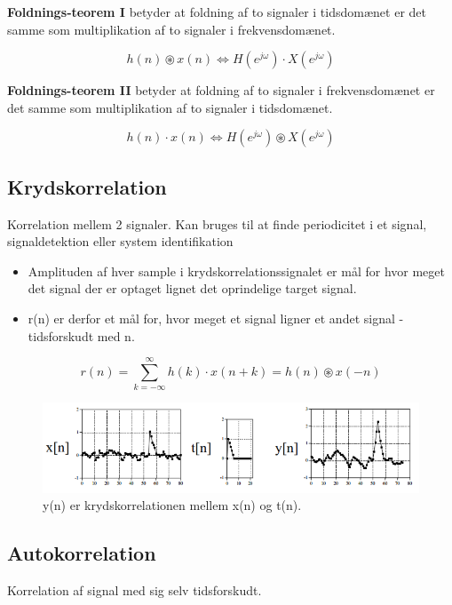 \documentclass[danish]{article}
\begin{document}
\textbf{Foldnings‐teorem I} betyder at foldning af to signaler i tidsdomænet er det samme som multiplikation af to signaler i frekvensdomænet.

\begin{equation}
h(n) \circledast x(n) \Leftrightarrow H(e^{j\omega}) \cdot X(e^{j\omega})
\end{equation}

\textbf{Foldnings-teorem II} betyder at foldning af to signaler i frekvensdomænet er det samme som multiplikation af to signaler i tidsdomænet. 

\begin{equation}
h(n) \cdot x(n) \Leftrightarrow H(e^{j\omega}) \circledast X(e^{j\omega})
\end{equation}

\subsection{Krydskorrelation}
Korrelation mellem 2 signaler.
Kan bruges til at finde periodicitet i et signal, signaldetektion eller system identifikation

\begin{itemize}
	\item Amplituden af hver sample i krydskorrelationssignalet er mål for hvor meget det signal der er optaget lignet det oprindelige target signal.
	\item r(n) er derfor et mål for, hvor meget et signal ligner et andet signal - tidsforskudt med n.
\end{itemize}
\begin{equation}
r(n) = \sum_{k=-\infty}^{\infty} h(k) \cdot x(n+k) = h(n) \circledast x(-n)
\end{equation}

\begin{figure}[H]
	\centering
	\includegraphics[width=0.8\linewidth]{graphics/crosscorrelation}
	\caption{y(n) er krydskorrelationen mellem x(n) og t(n).}
	\label{fig:crosscorrelation}
\end{figure}

\subsection{Autokorrelation}
Korrelation af signal med sig selv tidsforskudt.
\end{document}
